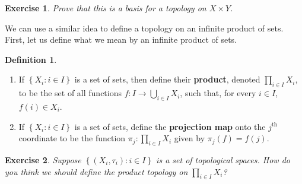 \documentclass[12pt]{amsart}
\newtheorem{exercise}{Exercise}[section]
\theoremstyle{definition}
\newtheorem{definition}[theorem]{Definition}
\theoremstyle{remark}
\newcommand{\explicitSet}[1]{\left\lbrace #1 \right\rbrace}
\newcommand{\set}[2]{\explicitSet{#1 \colon #2}}
\newcommand{\0}{\emptyset}
\begin{document}
\begin{exercise}
Prove that this is a basis for a topology on $X \times Y$.
\end{exercise}

We can use a similar idea to define a topology on an infinite product of sets. First, let us define what we mean by an infinite product of sets.

\begin{definition}\rm\
\begin{enumerate}
\item If $\set{X_i}{i \in I}$ is a set of sets, then define their \textbf{product}, denoted $\prod_{i \in I}X_i$, to be the set of all functions $f: I \to \bigcup_{i \in I}X_i$, such that, for every $i \in I$, $f(i) \in X_i$.
\item If $\set{X_i}{i \in I}$ is a set of sets, define the \textbf{projection map} onto the $j^{\mathrm{th}}$ coordinate to be the function $\pi_j: \prod_{i \in I}X_i$ given by $\pi_j(f) = f(j)$.
\end{enumerate}
\end{definition}

\begin{exercise}
Suppose $\set{(X_i,\tau_i)}{i \in I}$ is a set of topological spaces. How do you think we should define the product topology on $\prod_{i \in I}X_i$?
\end{exercise}
\end{document}
